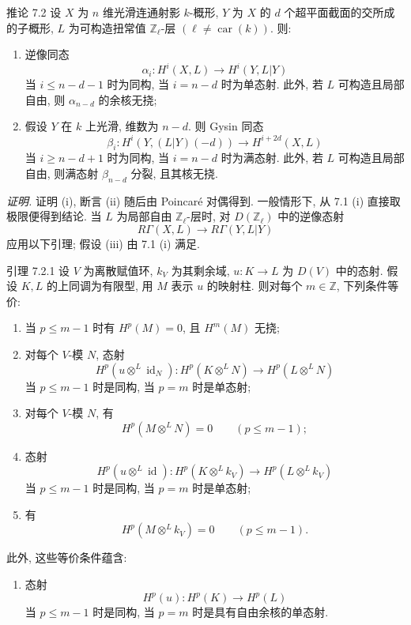 \begin{statement}{推论 7.2}
设 $X$ 为 $n$ 维光滑连通射影 $k$-概形, $Y$ 为 $X$ 的 $d$ 个超平面截面的交所成的子概形, $L$ 为可构造扭常值 $\mathbb Z_\ell$-层 $(\ell\ne\operatorname{car}(k))$. 则:
\begin{enumerate}[label=(\roman*)]
\item 逆像同态
\[
\alpha_i:H^i(X,L)\to H^i(Y,L|Y)
\]
当 $i\le n-d-1$ 时为同构, 当 $i=n-d$ 时为单态射. 此外, 若 $L$ 可构造且局部自由, 则 $\alpha_{n-d}$ 的余核无挠;
\item 假设 $Y$ 在 $k$ 上光滑, 维数为 $n-d$. 则 Gysin 同态
\[
\beta_i:H^i(Y,(L|Y)(-d))\to H^{i+2d}(X,L)
\]
当 $i\ge n-d+1$ 时为同构, 当 $i=n-d$ 时为满态射. 此外, 若 $L$ 可构造且局部自由, 则满态射 $\beta_{n-d}$ 分裂, 且其核无挠.
\end{enumerate}
\end{statement}

\emph{证明.} 证明 (i), 断言 (ii) 随后由 Poincaré 对偶得到. 一般情形下, 从 7.1 (i) 直接取极限便得到结论. 当 $L$ 为局部自由 $\mathbb Z_\ell$-层时, 对 $D(\mathbb Z_\ell)$ 中的逆像态射
\[
R\Gamma(X,L)\to R\Gamma(Y,L|Y)
\]
应用以下引理; 假设 (iii) 由 7.1 (i) 满足.

\begin{statement}{引理 7.2.1}
设 $V$ 为离散赋值环, $k_V$ 为其剩余域, $u:K\to L$ 为 $D(V)$ 中的态射. 假设 $K,L$ 的上同调为有限型, 用 $M$ 表示 $u$ 的映射柱. 则对每个 $m\in\mathbb Z$, 下列条件等价:
\begin{enumerate}[label=(\roman*)]
\item 当 $p\le m-1$ 时有 $H^p(M)=0$, 且 $H^m(M)$ 无挠;
\item 对每个 $V$-模 $N$, 态射
\[
H^p(u\otimes^L\operatorname{id}_N):H^p(K\otimes^L N)\to H^p(L\otimes^L N)
\]
当 $p\le m-1$ 时是同构, 当 $p=m$ 时是单态射;
\item[(ii bis)] 对每个 $V$-模 $N$, 有
\[
H^p(M\otimes^L N)=0\qquad(p\le m-1);
\]
\item 态射
\[
H^p(u\otimes^L\operatorname{id}):H^p(K\otimes^L k_V)\to H^p(L\otimes^L k_V)
\]
当 $p\le m-1$ 时是同构, 当 $p=m$ 时是单态射;
\item[(iii bis)] 有
\[
H^p(M\otimes^L k_V)=0\qquad(p\le m-1).
\]
\end{enumerate}
此外, 这些等价条件蕴含:
\begin{enumerate}[label=(\roman* bis)]
\item 态射
\[
H^p(u):H^p(K)\to H^p(L)
\]
当 $p\le m-1$ 时是同构, 当 $p=m$ 时是具有自由余核的单态射.
\end{enumerate}
\end{statement}

